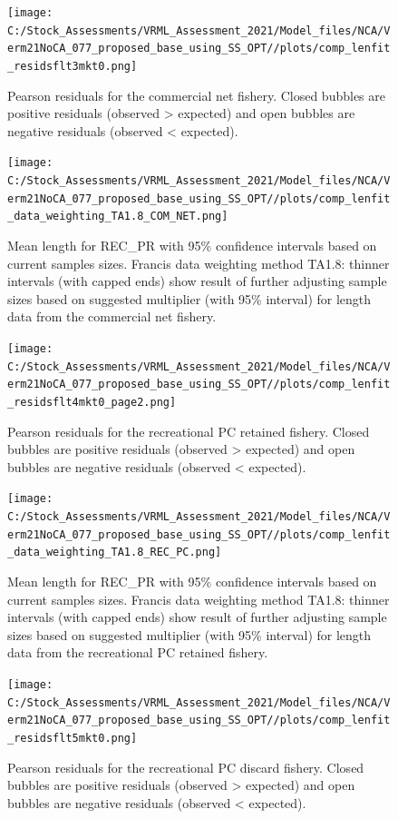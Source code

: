 \documentclass[
  english,
  a4paper,
]{article}
\begin{document}
\begin{figure}
\centering
\texttt{[image: C:/Stock\_Assessments/VRML\_Assessment\_2021/Model\_files/NCA/Verm21NoCA\_077\_proposed\_base\_using\_SS\_OPT//plots/comp\_lenfit\_residsflt3mkt0.png]}
\caption{Pearson residuals for the commercial net fishery. Closed bubbles are positive residuals (observed \textgreater{} expected) and open bubbles are negative residuals (observed \textless{} expected).\label{fig:len-pearson-COM-NET}}
\end{figure}

\begin{figure}
\centering
\texttt{[image: C:/Stock\_Assessments/VRML\_Assessment\_2021/Model\_files/NCA/Verm21NoCA\_077\_proposed\_base\_using\_SS\_OPT//plots/comp\_lenfit\_data\_weighting\_TA1.8\_COM\_NET.png]}
\caption{Mean length for REC\_PR with 95\% confidence intervals based on current samples sizes. Francis data weighting method TA1.8: thinner intervals (with capped ends) show result of further adjusting sample sizes based on suggested multiplier (with 95\% interval) for length data from the commercial net fishery.\label{fig:mean-len-fit-COM-NET}}
\end{figure}

\begin{figure}
\centering
\texttt{[image: C:/Stock\_Assessments/VRML\_Assessment\_2021/Model\_files/NCA/Verm21NoCA\_077\_proposed\_base\_using\_SS\_OPT//plots/comp\_lenfit\_residsflt4mkt0\_page2.png]}
\caption{Pearson residuals for the recreational PC retained fishery. Closed bubbles are positive residuals (observed \textgreater{} expected) and open bubbles are negative residuals (observed \textless{} expected).\label{fig:len-pearson-REC-PC}}
\end{figure}

\begin{figure}
\centering
\texttt{[image: C:/Stock\_Assessments/VRML\_Assessment\_2021/Model\_files/NCA/Verm21NoCA\_077\_proposed\_base\_using\_SS\_OPT//plots/comp\_lenfit\_data\_weighting\_TA1.8\_REC\_PC.png]}
\caption{Mean length for REC\_PR with 95\% confidence intervals based on current samples sizes. Francis data weighting method TA1.8: thinner intervals (with capped ends) show result of further adjusting sample sizes based on suggested multiplier (with 95\% interval) for length data from the recreational PC retained fishery.\label{fig:mean-len-fit-REC-PC}}
\end{figure}

\begin{figure}
\centering
\texttt{[image: C:/Stock\_Assessments/VRML\_Assessment\_2021/Model\_files/NCA/Verm21NoCA\_077\_proposed\_base\_using\_SS\_OPT//plots/comp\_lenfit\_residsflt5mkt0.png]}
\caption{Pearson residuals for the recreational PC discard fishery. Closed bubbles are positive residuals (observed \textgreater{} expected) and open bubbles are negative residuals (observed \textless{} expected).\label{fig:len-pearson-REC-PC-DIS}}
\end{figure}
\end{document}
